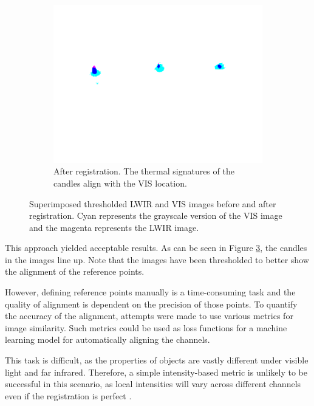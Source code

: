 \documentclass{l4proj}
\begin{document}
\begin{figure}[ht]
\begin{subfigure}[h!]{0.3\textwidth}
    \label{fig:linear_trans_zoom}
  \end{subfigure}
  \begin{subfigure}[h!]{0.3\textwidth}
    \includegraphics[width=\textwidth, trim={3.5cm 9cm 3.5cm 4.5cm}, clip, frame]{images/registration/registered_affine.png}
    \caption{After registration. The thermal signatures of the candles align with the VIS location.}
    \label{fig:linear_trans_affine}
  \end{subfigure}
  \caption{Superimposed thresholded LWIR and VIS images before and after registration. Cyan represents the grayscale version of the VIS image and the magenta represents the LWIR image.}
\end{figure}

This approach yielded acceptable results. As can be seen in Figure \ref{fig:linear_trans_affine}, the candles in the images line up. Note that the images have been thresholded to better show the alignment of the reference points.

However, defining reference points manually is a time-consuming task and the quality of alignment is dependent on the precision of those points. To quantify the accuracy of the alignment, attempts were made to use various metrics for image similarity. Such metrics could be used as loss functions for a machine learning model for automatically aligning the channels.

This task is difficult, as the properties of objects are vastly different under visible light and far infrared. Therefore, a simple intensity-based metric is unlikely to be successful in this scenario, as local intensities will vary across different channels even if the registration is perfect \citep{myronenko_intensity-based_2010}.
\end{document}
